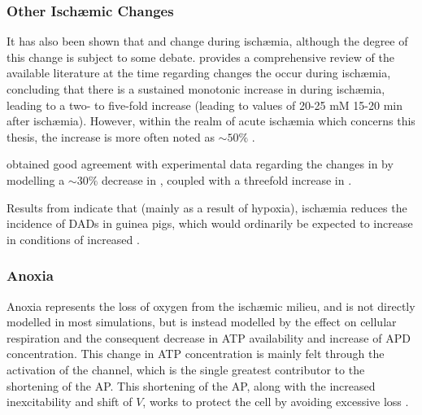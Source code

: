 \documentclass[../thesis-main.tex]{subfiles}
\begin{document}
\subsubsection{Other Isch\ae{}mic Changes}
\label{subsubsec:ischaemia-other}
It has also been shown that \nai{} and \nao{} change during isch\ae{}mia, although the degree of this change is subject to some debate. \citet{Carmeliet1999} provides a comprehensive review of the available literature at the time regarding changes the occur during isch\ae{}mia, concluding that there is a sustained monotonic increase in \nai{} during isch\ae{}mia, leading to a two- to five-fold increase (leading to values of 20-25 mM 15-20 min after isch\ae{}mia). However, within the realm of acute isch\ae{}mia which concerns this thesis, the increase is more often noted as $\sim50\%$ \citep{Malloy1990, Pike1993, VanEchteld1991, Tani1989}.

\citet{Noble2002} obtained good agreement with experimental data regarding the changes in \cai{} by modelling a $\sim30\%$ decrease in \nao{}, coupled with a threefold increase in \nai{}.

Results from \citet{Coetzee1987} indicate that (mainly as a result of hypoxia), isch\ae{}mia reduces the incidence of DADs in guinea pigs, which would ordinarily be expected to increase in conditions of increased \cai{}.


\subsubsection{Anoxia}
\label{subsubsec:Anoxia}
Anoxia represents the loss of oxygen from the isch\ae{}mic milieu, and is not directly modelled in most simulations, but is instead modelled by the effect on cellular respiration and the consequent decrease in ATP availability and increase of APD concentration. This change in ATP concentration is mainly felt through the activation of the \ikatp{} channel, which is the single greatest contributor to the shortening of the AP. This shortening of the AP, along with the increased inexcitability and shift of $V$, works to protect the cell by avoiding excessive \K{} loss \citep{Carmeliet1999}.
\end{document}
